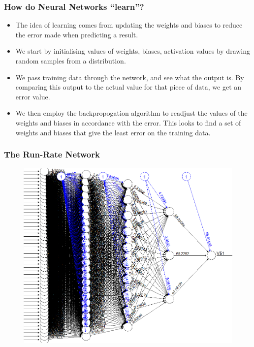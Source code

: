 \documentclass{beamer}
\begin{document}
\begin{frame}
    \frametitle{How do Neural Networks ``learn''?}
    \begin{itemize}
        \item The idea of learning comes from updating the weights and biases to reduce the error made when predicting a result.
        \pause
        \item We start by initialising values of weights, biases, activation values by drawing random samples from a distribution. 
        \pause
        \item We pass training data through the network, and see what the output is. By comparing this output to the actual value for that piece of data, we get an error value. 
        \pause
        \item We then employ the backpropogation algorithm to readjust the values of the weights and biases in accordance with the 
            error. This looks to find a set of weights and biases that give the least error on the training data.
    \end{itemize}
\end{frame}

\begin{frame}
    \frametitle{The Run-Rate Network}
    \begin{figure}
        \centering
        \includegraphics[scale=0.2]{../Thesis/figures/net.png}
    \end{figure} 
\end{frame}
\end{document}
